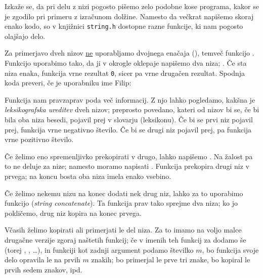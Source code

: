 

Izkaže se, da pri delu z nizi pogosto pišemo zelo podobne kose programa, kakor
se je zgodilo pri primeru z izračunom dolžine.
Namesto da večkrat napišemo skoraj enako kodo, so v knjižnici \verb+string.h+
dostopne razne funkcije, ki nam pogosto olajšajo delo.


Za primerjavo dveh nizov \underline{ne} uporabljamo dvojnega enačaja
(\koda{==}), temveč funkcijo .
Funkcijo uporabimo tako, da ji v okrogle oklepaje napišemo dva niza;
.
Če sta niza enaka, funkcija vrne rezultat \texttt{0}, sicer pa vrne drugačen
rezultat.
Spodnja koda preveri, če je uporabniku ime Filip:


Funkcija nam pravzaprav poda več informacij.
Z njo lahko pogledamo, kakšna je \emph{leksikografska ureditev} dveh nizov;
preprosto povedano, kateri od nizov bi se, če bi bila oba niza besedi, pojavil
prej v slovarju (leksikonu).
Če bi se prvi niz pojavil prej, funkcija vrne negativno število.
Če bi se drugi niz pojavil prej, pa funkcija vrne pozitivno število.


Če želimo eno spremenljivko prekopirati v drugo, lahko napišemo .
Na žalost pa to ne deluje za nize; namesto  moramo napisati
.
Funkcija  prekopira drugi niz v prvega; na koncu bosta oba niza
imela enako vsebino.

Če želimo nekemu nizu na konec dodati nek drug niz, lahko za to uporabimo
funkcijo  (\emph{string concatenate}).
Ta funkcija prav tako sprejme dva niza; ko jo pokličemo, drug niz kopira na
konec prvega.


Včasih želimo kopirati ali primerjati le del niza.
Za to imamo na voljo malce drugačne verzije zgoraj naštetih funkcij; če v imenih
teh funkcij za  dodamo še  (torej ,
, \ldots), in funkciji kot zadnji argument podamo številko $m$, bo
funkcija svoje delo opravila le na prvih $m$ znakih;
 bo primerjal le prve tri znake,
 bo kopiral le prvih sedem znakov, ipd.